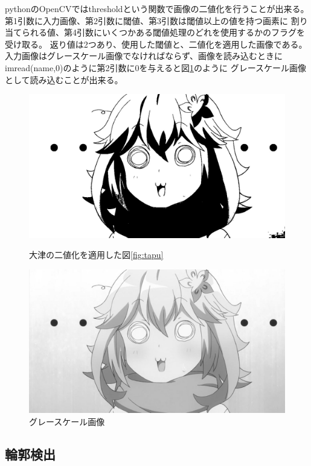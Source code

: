 \documentclass[dvipdfmx]{jsarticle}
\begin{document}
pythonのOpenCVではthresholdという関数で画像の二値化を行うことが出来る。
第1引数に入力画像、第2引数に閾値、第3引数は閾値以上の値を持つ画素に
割り当てられる値、第4引数にいくつかある閾値処理のどれを使用するかのフラグを受け取る。
返り値は2つあり、使用した閾値と、二値化を適用した画像である。
入力画像はグレースケール画像でなければならず、画像を読み込むときに
imread(name,0)のように第2引数に0を与えると図\ref{fig:grayscale}のように
グレースケール画像として読み込むことが出来る。
\begin{figure}[H]
  \begin{minipage}{0.5\hsize}
    \centering
    \includegraphics[width=0.9\hsize]{../pic/binarization.jpg}
    \caption{大津の二値化を適用した図\ref{fig:tapu}}
    \label{fig:binarization}
  \end{minipage}
  \begin{minipage}{0.5\hsize}
    \centering
    \includegraphics[width=0.9\hsize]{../pic/grayscale.png}
    \caption{グレースケール画像}
    \label{fig:grayscale}
  \end{minipage}
\end{figure}


\subsection{輪郭検出}
\end{document}

